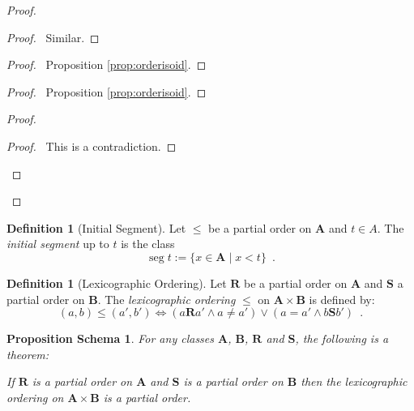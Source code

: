 \documentclass{book}
\let\qed\relax
\newtheorem{props}[ax]{Proposition Schema}
\theoremstyle{definition}
\newtheorem{df}[ax]{Definition}
\newcommand{\seg}{\ensuremath{\operatorname{seg}}}
\begin{document}
\begin{proof}
\begin{proof}
	\pf\ Similar.
\end{proof}
\begin{proof}
	\pf\ Proposition \ref{prop:orderisoid}.
\end{proof}
\begin{proof}
	\pf\ Proposition \ref{prop:orderisoid}.
\end{proof}
\begin{proof}
	\qedstep
	\begin{proof}
		\pf\ This is a contradiction.
	\end{proof}
\end{proof}
\qed
\end{proof}

\begin{df}[Initial Segment]
Let $\leq$ be a partial order on $\mathbf{A}$ and $t \in A$. The \emph{initial segment} up to $t$ is the class
\[ \seg t := \{ x \in \mathbf{A} \mid x < t \} \enspace . \]
\end{df}

\begin{df}[Lexicographic Ordering]
Let $\mathbf{R}$ be a partial order on $\mathbf{A}$ and $\mathbf{S}$ a partial order on $\mathbf{B}$. The \emph{lexicographic ordering} $\leq$ on $\mathbf{A} \times \mathbf{B}$ is defined by:
\[ (a,b) \leq (a',b') \Leftrightarrow (a \mathbf{R} a' \wedge a \neq a') \vee (a = a' \wedge b \mathbf{S} b') \enspace . \]
\end{df}

\begin{props}
\label{prop:lexicposet}
For any classes $\mathbf{A}$, $\mathbf{B}$, $\mathbf{R}$ and $\mathbf{S}$, the following is a theorem:

If $\mathbf{R}$ is a partial order on $\mathbf{A}$ and $\mathbf{S}$ is a partial order on $\mathbf{B}$ then the lexicographic ordering on $\mathbf{A} \times \mathbf{B}$ is a partial order.
\end{props}
\end{document}
